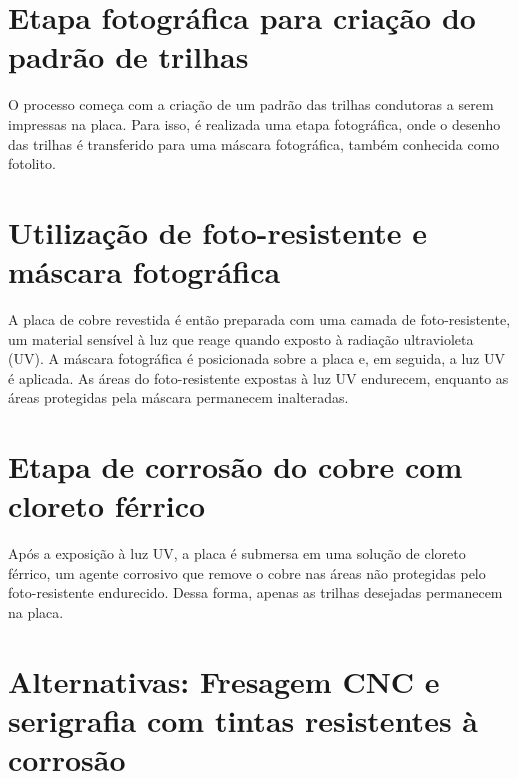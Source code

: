 \hypertarget{etapa-fotogruxe1fica-para-criauxe7uxe3o-do-padruxe3o-de-trilhas}{%
\section{Etapa fotográfica para criação do padrão de trilhas}\label{etapa-fotogruxe1fica-para-criauxe7uxe3o-do-padruxe3o-de-trilhas}}

O processo começa com a criação de um padrão das trilhas condutoras a serem impressas na placa. Para isso, é realizada uma etapa fotográfica, onde o desenho das trilhas é transferido para uma máscara fotográfica, também conhecida como fotolito.

\hypertarget{utilizauxe7uxe3o-de-foto-resistente-e-muxe1scara-fotogruxe1fica}{%
\section{Utilização de foto-resistente e máscara fotográfica}\label{utilizauxe7uxe3o-de-foto-resistente-e-muxe1scara-fotogruxe1fica}}

A placa de cobre revestida é então preparada com uma camada de foto-resistente, um material sensível à luz que reage quando exposto à radiação ultravioleta (UV). A máscara fotográfica é posicionada sobre a placa e, em seguida, a luz UV é aplicada. As áreas do foto-resistente expostas à luz UV endurecem, enquanto as áreas protegidas pela máscara permanecem inalteradas.

\hypertarget{etapa-de-corrosuxe3o-do-cobre-com-cloreto-fuxe9rrico}{%
\section{Etapa de corrosão do cobre com cloreto férrico}\label{etapa-de-corrosuxe3o-do-cobre-com-cloreto-fuxe9rrico}}

Após a exposição à luz UV, a placa é submersa em uma solução de cloreto férrico, um agente corrosivo que remove o cobre nas áreas não protegidas pelo foto-resistente endurecido. Dessa forma, apenas as trilhas desejadas permanecem na placa.

\hypertarget{alternativas-fresagem-cnc-e-serigrafia-com-tintas-resistentes-uxe0-corrosuxe3o}{%
\section{Alternativas: Fresagem CNC e serigrafia com tintas resistentes à corrosão}\label{alternativas-fresagem-cnc-e-serigrafia-com-tintas-resistentes-uxe0-corrosuxe3o}}

